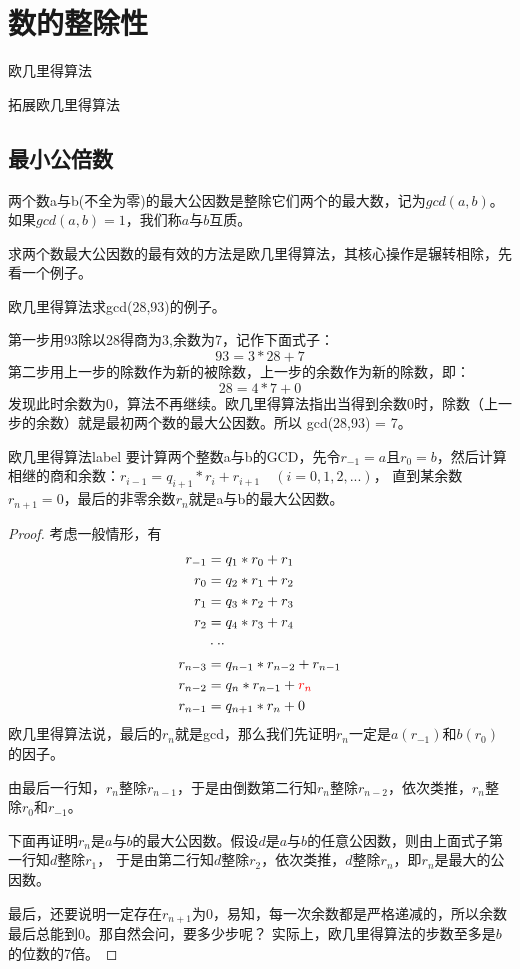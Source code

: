 \chapter{数的整除性}
\begin{introduction}[本章内容提要]
	\item 欧几里得算法
	\item 拓展欧几里得算法
\end{introduction}

\section{最小公倍数}
两个数a与b(不全为零)的最大公因数是整除它们两个的最大数，记为$gcd(a,b)$。如果$gcd(a,b)=1$，我们称$a$与$b$互质。

求两个数最大公因数的最有效的方法是{\heiti 欧几里得算法}，其核心操作是辗转相除，先看一个例子。

\begin{example}
	欧几里得算法求gcd(28,93)的例子。
	
	第一步用93除以28得商为3,余数为7，记作下面式子：
	$$
		93 = 3*28 + 7
	$$
	第二步用上一步的除数作为新的被除数，上一步的余数作为新的除数，即：
	$$
		28 = 4*7 + 0
	$$
	发现此时余数为0，算法不再继续。欧几里得算法指出当得到余数0时，除数（上一步的余数）就是最初两个数的最大公因数。所以
	gcd(28,93) = 7。
\end{example}

\begin{theorem}{欧几里得算法}{label}
	要计算两个整数a与b的GCD，先令$r_{-1}=a$且$r_{0}=b$，然后计算相继的商和余数：$r_{i-1}=q_{i+1}*r_{i}+r_{i+1} \quad (i=0,1,2,...)$，
	直到某余数$r_{n+1}=0$，最后的非零余数$r_{n}$就是a与b的最大公因数。
\end{theorem}

\begin{proof}
	考虑一般情形，有
	\begin{align*}
	r_{-1} &= q_1*r_0 + r_1 \\
	r_0 &= q_2*r_1 + r_2 \\
	r_1 &= q_3 * r_2 + r_3 \\
	r_2 &= q_4 * r_3 + r_4 \\
 	&\cdot \cdot \cdot\\
	r_{n-3} &= q_{n-1}*r_{n-2} + r_{n-1} \\
	r_{n-2} &= q_{n} * r_{n-1} + {\color{red} r_n} \\
	r_{n-1} &= q_{n+1} * r_n + 0 \\
	\end{align*}
	欧几里得算法说，最后的$r_n$就是gcd，那么我们先证明$r_n$一定是$a(r_{-1})$和$b(r_0)$的因子。
	
	由最后一行知，$r_n$整除$r_{n-1}$，于是由倒数第二行知$r_n$整除$r_{n-2}$，依次类推，$r_n$整除$r_{0}$和$r_{-1}$。
	
	下面再证明$r_n$是$a$与$b$的{\heiti 最大}公因数。假设$d$是$a$与$b$的任意公因数，则由上面式子第一行知$d$整除$r_1$，
	于是由第二行知$d$整除$r_2$，依次类推，$d$整除$r_n$，即$r_n$是最大的公因数。
	
	最后，还要说明一定存在$r_{n+1}$为0，易知，每一次余数都是严格递减的，所以余数最后总能到0。那自然会问，要多少步呢？
	实际上，{\heiti 欧几里得算法的步数至多是$b$的位数的7倍}。
\end{proof}


